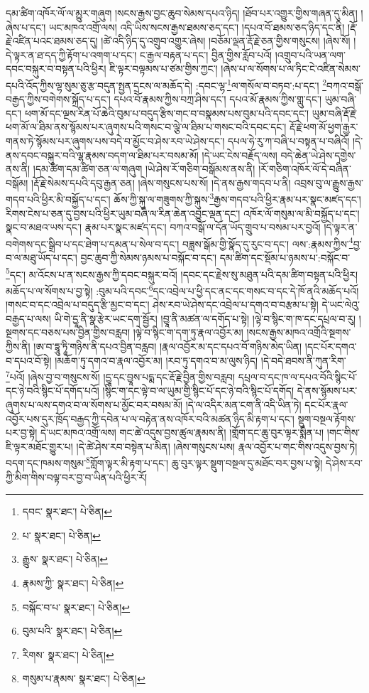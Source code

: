 དམ་ཚིག་འཁོར་ལོ་ལ་མྱུར་གཞུག །སངས་རྒྱས་བྱང་ཆུབ་སེམས་དཔའ་ཉིད། །ཐོབ་པར་འགྱུར་གྱིས་གཞན་དུ་མིན། །ཞེས་པ་དང་། ཡང་མཁའ་འགྲོ་ལས། འདི་ཡིས་སངས་རྒྱས་ཐམས་ཅད་དང་། །དཔའ་བོ་ཐམས་ཅད་ཉིད་དང་ནི། །རྡོ་རྗེ་འཛིན་པའང་ཐམས་ཅད་དུ། །ཚེ་འདི་ཉིད་དུ་འགྲུབ་འགྱུར་ཞེས། །བཅོམ་ལྡན་རྡོ་རྗེ་ཅན་གྱིས་གསུངས། །ཞེས་སོ། །དེ་ལྟར་ན་ཐ་དད་ཀྱི་རྟོག་པ་འགག་པ་དང་། ང་རྒྱལ་བརྟན་པ་དང་། བྱིན་གྱིས་རློབ་པའོ། །འགྲུབ་པའི་ཡན་ལག་དབང་བསྐུར་བ་བསྟན་པའི་ཕྱིར། ཇི་ལྟར་བལྟམས་པ་ཙམ་གྱིས་ཀྱང་། །ཞེས་པ་ལ་སོགས་པ་ལ་ཏིང་ངེ་འཛིན་སེམས་དཔའི་འོད་ཀྱིས་ལྷ་སུམ་ཅུ་རྩ་བདུན་སྤྱན་དྲངས་ལ་མཆོད་དེ། :དབང་ལྷ་\footnote{དབང་  སྣར་ཐང་།  པེ་ཅིན། }ལ་གསོལ་བ་བཏབ་:པ་དང་། \footnote{པ་  སྣར་ཐང་།  པེ་ཅིན། }བཀའ་བསྒོ་བརྒྱད་ཀྱིས་བགེགས་སྐྲོད་པ་དང་། དཔའ་བོ་རྣམས་ཀྱིས་བཀྲ་ཤིས་དང་། དཔའ་མོ་རྣམས་ཀྱིས་གླུ་དང་། ཡུམ་བཞི་དང་། ཕག་མོ་དང་ལྔས་རིན་པོ་ཆེའི་བུམ་པ་བདུད་རྩིས་གང་བ་བསྣམས་པས་བུམ་པའི་དབང་དང་། ཡུམ་བཞི་རྡོ་རྗེ་ཕག་མོ་ལ་ཐིམ་ནས་སྙོམས་པར་ཞུགས་པའི་གསང་བ་ལྕེ་ལ་ཐིམ་པ་གསང་བའི་དབང་དང་། རྡོ་རྗེ་ཕག་མོ་ཕྱག་རྒྱར་གནས་ཏེ་སྙོམས་པར་ཞུགས་པས་བདེ་བ་མྱོང་བ་ཤེས་རབ་ཡེ་ཤེས་དང་། དཔལ་ཧེ་རུ་ཀ་བཞི་པ་བསྟན་པ་བཞིའོ། །དེ་ནས་དབང་བསྐུར་བའི་ལྷ་རྣམས་བདག་ལ་ཐིམ་པར་བསམ་མོ། །དེ་ཡང་ངེས་བརྗོད་ལས། བདེ་ཆེན་ཡེ་ཤེས་དགྱེས་ནས་ནི། །དམ་ཚིག་དམ་ཚིག་ཅན་ལ་གཞུག །ཡེ་ཤེས་རོ་གཅིག་བསྒོམས་ནས་ནི། །རོ་གཅིག་འཁོར་ལོ་དེ་བཞིན་བསྒོམ། །རྡོ་རྗེ་སེམས་དཔའི་དབུ་རྒྱན་ཅན། །ཞེས་གསུངས་པས་སོ། །དེ་ནས་རྒྱས་གདབ་པ་ནི། འབྲས་བུ་ལ་རྒྱུས་རྒྱས་གདབ་པའི་ཕྱིར་མི་བསྐྱོད་པ་དང་། ཆོས་ཀྱི་སྐུ་ལ་གཟུགས་ཀྱི་སྐུས་\footnote{རྒྱུས་  སྣར་ཐང་།  པེ་ཅིན། }རྒྱས་གདབ་པའི་ཕྱིར་རྣམ་པར་སྣང་མཛད་དང་། རིགས་ངེས་པ་ཅན་དུ་བྱས་པའི་ཕྱིར་ཡུམ་བཞི་ལ་རིན་ཆེན་འབྱུང་ལྡན་དང་། འཁོར་ལོ་གསུམ་ལ་མི་བསྐྱོད་པ་དང་། སྣང་བ་མཐའ་ཡས་དང་། རྣམ་པར་སྣང་མཛད་དང་། བཀའ་བསྒོ་ལ་དོན་ཡོད་གྲུབ་པ་བསམ་པར་བྱའོ། །དེ་ལྟར་ན་བགེགས་དང་སྒྲིབ་པ་དང་ཐེག་པ་དམན་པ་སེལ་བ་དང་། བཟླས་སྒོམ་གྱི་སྣོད་དུ་རུང་བ་དང་། ལས་:རྣམས་ཀྱིས་\footnote{རྣམས་ཀྱི་  སྣར་ཐང་།  པེ་ཅིན། }བྱ་བ་ལ་མཐུ་ཡོད་པ་དང་། བྱང་ཆུབ་ཀྱི་སེམས་ཉམས་པ་བསྐོང་བ་དང་། དམ་ཚིག་དང་སྡོམ་པ་ཉམས་པ་:བསྐོང་བ་\footnote{བསྐོང་བ་པ་  སྣར་ཐང་།  པེ་ཅིན། }དང་། མ་འོངས་པ་ན་སངས་རྒྱས་ཀྱི་དབང་བསྐུར་བའོ། །དབང་དང་རྗེས་སུ་མཐུན་པའི་དམ་ཚིག་བསྟན་པའི་ཕྱིར། མཆོད་པ་ལ་སོགས་པ་བྱ་སྟེ། :བུམ་པའི་དབང་\footnote{བུམ་པའི་  སྣར་ཐང་།  པེ་ཅིན། }དང་འབྲེལ་པ་ཕྱི་དང་ནང་དང་གསང་བ་དང་དེ་ཁོ་ནའི་མཆོད་པའོ། །གསང་བ་དང་འབྲེལ་པ་བདུད་རྩི་མྱང་བ་དང་། ཤེས་རབ་ཡེ་ཤེས་དང་འབྲེལ་པ་དགའ་བ་བརྩམ་པ་སྟེ། དེ་ཡང་ལེའུ་བརྒྱད་པ་ལས། ཡི་གེ་དྱཱ་ནི་སྣ་རྩེར་ཡང་དག་སྦྱོར། །བྱཱ་ནི་མཚན་ལ་དགོད་པ་སྟེ། །ལྟེ་བ་སྙིང་ག་ཁ་དང་དཔྲལ་བ་རུ། །སྔགས་དང་བཅས་པས་བྱིན་གྱིས་བརླབ། །ལྟེ་བ་སྙིང་ག་དག་ཏུ་རྣལ་འབྱོར་མ། །སངས་རྒྱས་མཁའ་འགྲོའི་སྔགས་ཀྱིས་ནི། །ཨ་བ་དྷཱུ་ཏཱི་གཉིས་ནི་དཔའ་བྱིན་བརླབ། །རྣལ་འབྱོར་མ་དང་དཔའ་བོ་གཉིས་མེད་ཡིན། །དང་པོར་དགའ་བ་དཔའ་བོ་སྟེ། །མཆོག་ཏུ་དགའ་བ་རྣལ་འབྱོར་མ། །རབ་ཏུ་དགའ་བ་མ་ལུས་ཉིད། །དེ་བདེ་ཐབས་ནི་ཀུན་རིག་\footnote{རིགས་  སྣར་ཐང་།  པེ་ཅིན། }པའོ། །ཞེས་བྱ་བ་གསུངས་སོ། །དྱཱ་དང་བྱཱས་པདྨ་དང་རྡོ་རྗེ་བྱིན་གྱིས་བརླབ། དཔྲལ་བ་དང་ཁ་ལ་དཔའ་བོའི་སྙིང་པོ་དང་ཉེ་བའི་སྙིང་པོ་དགོད་པའོ། །སྙིང་ག་དང་ལྟེ་བ་ལ་ཡུམ་གྱི་སྙིང་པོ་དང་ཉེ་བའི་སྙིང་པོ་དགོད། དེ་ནས་སྙོམས་པར་ཞུགས་པ་ལས་དགའ་བ་ལ་སོགས་པ་མྱོང་བར་བསམ་མོ། །དེ་ལ་འདིར་མན་ངག་ནི་འདི་ཡིན་ཏེ། དང་པོར་རྣལ་འབྱོར་པས་དུར་ཁྲོད་བརྒྱད་ཀྱི་དབེན་པ་ལ་བརྟེན་ནས་འཁོར་བའི་མཚན་ཉིད་མི་རྟག་པ་དང་། སྡུག་བསྔལ་རྟོགས་པར་བྱ་སྟེ། དེ་ཡང་མཁའ་འགྲོ་ལས། གང་ཚེ་འདུས་བྱས་ཚུལ་རྣམས་ནི། །གློག་དང་ཆུ་བུར་ལྟར་སྨིན་པ། །གང་གིས་ཇི་ལྟར་མཐོང་གྱུར་པ། །དེ་ཚེ་ཤེས་རབ་བསྟེན་པ་མིན། །ཞེས་གསུངས་པས། རྣལ་འབྱོར་པ་གང་གིས་འདུས་བྱས་ཏེ། བདག་དང་ཁམས་གསུམ་\footnote{གསུམ་པ་རྣམས་  སྣར་ཐང་།  པེ་ཅིན། }གློག་ལྟར་མི་རྟག་པ་དང་། ཆུ་བུར་ལྟར་སྡུག་བསྔལ་དུ་མཐོང་བར་བྱས་པ་སྟེ། དེ་ཤེས་རབ་ཀྱི་མིག་གིས་བལྟ་བར་བྱ་བ་ཡིན་པའི་ཕྱིར་རོ། 